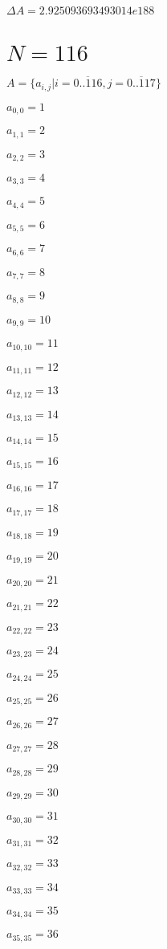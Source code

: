 \documentclass[a4paper,12pt]{article}
\begin{document}
$\Delta A = 2.925093693493014e188$



\section{ $N = 116$ }
$A = \{ a _{ i, j } | i = \overline { 0..116 }, j = \overline { 0..117 } \}$

$a _{ 0, 0 } = 1$

$a _{ 1, 1 } = 2$

$a _{ 2, 2 } = 3$

$a _{ 3, 3 } = 4$

$a _{ 4, 4 } = 5$

$a _{ 5, 5 } = 6$

$a _{ 6, 6 } = 7$

$a _{ 7, 7 } = 8$

$a _{ 8, 8 } = 9$

$a _{ 9, 9 } = 10$

$a _{ 10, 10 } = 11$

$a _{ 11, 11 } = 12$

$a _{ 12, 12 } = 13$

$a _{ 13, 13 } = 14$

$a _{ 14, 14 } = 15$

$a _{ 15, 15 } = 16$

$a _{ 16, 16 } = 17$

$a _{ 17, 17 } = 18$

$a _{ 18, 18 } = 19$

$a _{ 19, 19 } = 20$

$a _{ 20, 20 } = 21$

$a _{ 21, 21 } = 22$

$a _{ 22, 22 } = 23$

$a _{ 23, 23 } = 24$

$a _{ 24, 24 } = 25$

$a _{ 25, 25 } = 26$

$a _{ 26, 26 } = 27$

$a _{ 27, 27 } = 28$

$a _{ 28, 28 } = 29$

$a _{ 29, 29 } = 30$

$a _{ 30, 30 } = 31$

$a _{ 31, 31 } = 32$

$a _{ 32, 32 } = 33$

$a _{ 33, 33 } = 34$

$a _{ 34, 34 } = 35$

$a _{ 35, 35 } = 36$
\end{document}
